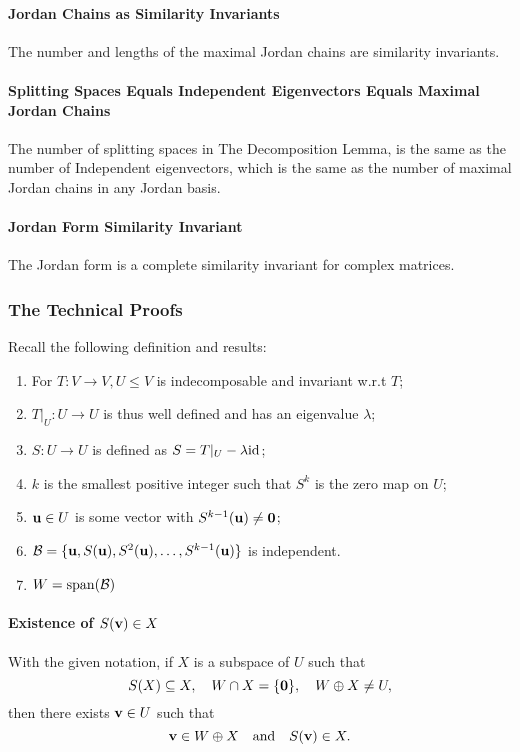 \paragraph{Jordan Chains as Similarity Invariants}
The number and lengths of the maximal Jordan chains are similarity invariants.

\paragraph{Splitting Spaces Equals Independent Eigenvectors Equals Maximal Jordan Chains}
The number of splitting spaces in The Decomposition Lemma, is the same as the number of Independent eigenvectors, which is the same as the number of maximal Jordan chains in any Jordan basis.

\paragraph{Jordan Form Similarity Invariant}
The Jordan form is a complete similarity invariant for complex matrices.

\subsubsection{The Technical Proofs}
Recall the following definition and results:
\begin{enumerate}[label=\alph*)]
    \item For \(T: V \to V, U \leq V\) is indecomposable and invariant w.r.t \(T\);
    \item \(T|_U: U \to U\) is thus well defined and has an eigenvalue \(\lambda\);
    \item \(S: U \to U\) is defined as \(S = T|_U - \lambda\mathrm{id}\);
    \item \(k\) is the smallest positive integer such that \(S^k\) is the zero map on \(U\);
    \item \(\mathbf{u} \in U\) is some vector with \(S^{k-1}(\mathbf{u}) \neq \mathbf{0}\);
    \item \(\mathcal{B} = \{\mathbf{u}, S(\mathbf{u}), S^2(\mathbf{u}), \dots, S^{k-1}(\mathbf{u}) \}\) is independent.
    \item \(W = \mathrm{span}(\mathcal{B})\)
\end{enumerate}

\paragraph{Existence of \(S(\mathbf{v}) \in X\)}
With the given notation, if \(X\) is a subspace of \(U\) such that
\[S(X) \subseteq X, \quad W \cap X = \{\mathbf{0}\}, \quad W \oplus X \neq U,\]
then there exists \(\mathbf{v} \in U\) such that
\[\mathbf{v} \in W \oplus X \quad \text{and} \quad S(\mathbf{v}) \in X.\]

